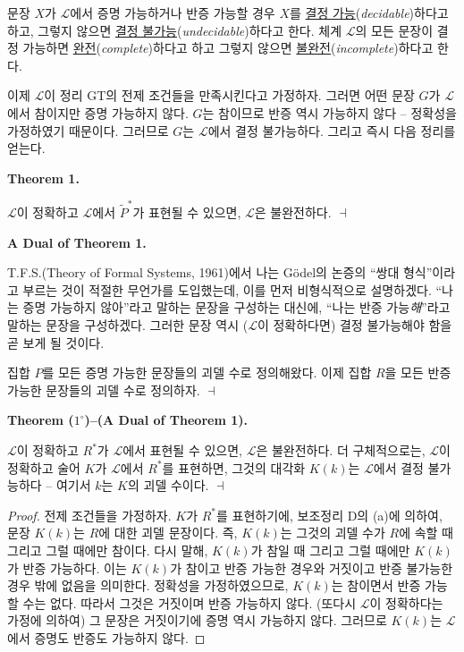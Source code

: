 \documentclass[12pt]{paper}
\newenvironment{context}[1][]
{ \noindent \textbf{{#1}.}
}
{ \hfill $ \dashv $
}
\begin{document}
문장 $X$가 $\mathcal{L}$에서 증명 가능하거나 반증 가능할 경우 $X$를 \underline{결정 가능}(\textit{decidable})하다고 하고,
그렇지 않으면 \underline{결정 불가능}(\textit{undecidable})하다고 한다.
체계 $\mathcal{L}$의 모든 문장이 결정 가능하면 \underline{완전}(\textit{complete})하다고 하고 그렇지 않으면 \underline{불완전}(\textit{incomplete})하다고 한다.

이제 $\mathcal{L}$이 정리 GT의 전제 조건들을 만족시킨다고 가정하자.
그러면 어떤 문장 $G$가 $\mathcal{L}$에서 참이지만 증명 가능하지 않다.
$G$는 참이므로 반증 역시 가능하지 않다 --
정확성을 가정하였기 때문이다.
그러므로 $G$는 $\mathcal{L}$에서 결정 불가능하다.
그리고 즉시 다음 정리를 얻는다.

\begin{context}[Theorem 1]
$\mathcal{L}$이 정확하고 $\mathcal{L}$에서 $\tilde{P}^{*}$가 표현될 수 있으면,
$\mathcal{L}$은 불완전하다.
\end{context}

\begin{context}[A Dual of Theorem 1]
T.F.S.(Theory of Formal Systems, 1961)에서 나는 G\"odel의 논증의 ``쌍대 형식''이라고 부르는 것이 적절한 무언가를 도입했는데,
이를 먼저 비형식적으로 설명하겠다.
``나는 증명 가능하지 않아''라고 말하는 문장을 구성하는 대신에,
``나는 반증 가능\textit{해}''라고 말하는 문장을 구성하겠다.
그러한 문장 역시 ($\mathcal{L}$이 정확하다면) 결정 불가능해야 함을 곧 보게 될 것이다.

집합 $P$를 모든 증명 가능한 문장들의 괴델 수로 정의해왔다.
이제 집합 $R$을 모든 반증 가능한 문장들의 괴델 수로 정의하자.
\end{context}

\begin{context}[Theorem ($1^{\circ}$)--(A Dual of Theorem 1)]
$\mathcal{L}$이 정확하고 $R^{*}$가 $\mathcal{L}$에서 표현될 수 있으면,
$\mathcal{L}$은 불완전하다.
더 구체적으로는, $\mathcal{L}$이 정확하고 술어 $K$가 $\mathcal{L}$에서 $R^{*}$를 표현하면,
그것의 대각화 $K \left( k \right)$는 $\mathcal{L}$에서 결정 불가능하다 --
여기서 $k$는 $K$의 괴델 수이다.
\end{context}

\begin{proof}
전제 조건들을 가정하자.
$K$가 $R^{*}$를 표현하기에, 보조정리 D의 (a)에 의하여,
문장 $K \left( k \right)$는 $R$에 대한 괴델 문장이다.
즉, $K \left( k \right)$는 그것의 괴델 수가 $R$에 속할 때 그리고 그럴 때에만 참이다.
다시 말해, $K \left( k \right)$가 참일 때 그리고 그럴 때에만 $K \left( k \right)$가 반증 가능하다.
이는 $K \left( k \right)$가 참이고 반증 가능한 경우와 거짓이고 반증 불가능한 경우 밖에 없음을 의미한다.
정확성을 가정하였으므로, $K \left( k \right)$는 참이면서 반증 가능할 수는 없다.
따라서 그것은 거짓이며 반증 가능하지 않다.
(또다시 $\mathcal{L}$이 정확하다는 가정에 의하여) 그 문장은 거짓이기에 증명 역시 가능하지 않다.
그러므로 $K \left( k \right)$는 $\mathcal{L}$에서 증명도 반증도 가능하지 않다.
\end{proof}
\end{document}
